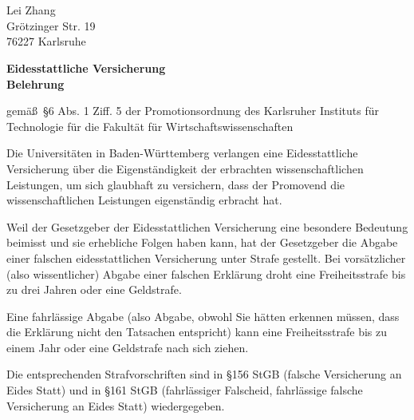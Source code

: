 \cleardoublepage
\section*{}
\thispagestyle{plain}
\vspace{-3cm}
\begin{flushright}
  \noindent
  Lei Zhang\\
  Gr\"otzinger Str. 19\\
  76227 Karlsruhe\\
\end{flushright}

\vspace{0.5cm}

\begin{center}
\textbf{\Large{Eidesstattliche Versicherung}}\\
\vspace{0.5cm}
\textbf{\Large{Belehrung}}
\vspace{0.5cm}

\noindent
gem\"a\ss ~\S 6 Abs. 1 Ziff. 5 der Promotionsordnung des Karlsruher
Instituts f\"ur Technologie f\"ur die Fakult\"at f\"ur
Wirtschaftswissenschaften

\end{center}


\noindent
Die Universit\"aten in Baden-W\"urttemberg verlangen eine Eidesstattliche
Versicherung \"uber die Eigenst\"andigkeit der erbrachten
wissenschaftlichen Leistungen, um sich glaubhaft zu versichern, dass
der Promovend die wissenschaftlichen Leistungen eigenst\"andig erbracht
hat.

\vspace{0.2cm}
\noindent
Weil der Gesetzgeber der Eidesstattlichen Versicherung eine besondere
Bedeutung bei\-misst und sie erhebliche Folgen haben kann, hat der
Gesetzgeber die Abgabe einer falschen eidesstattlichen Versicherung
unter Strafe gestellt. Bei vors\"atzlicher (also wissentlicher) Abgabe
einer falschen Erkl\"arung droht eine Freiheitsstrafe bis zu drei Jahren
oder eine Geldstrafe.

\vspace{0.2cm}
\noindent
Eine fahrl\"assige Abgabe (also Abgabe, obwohl Sie h\"atten erkennen
m\"ussen, dass die Erkl\"arung nicht den Tatsachen entspricht) kann eine
Freiheitsstrafe bis zu einem Jahr oder eine Geldstrafe nach sich
ziehen.

\vspace{0.2cm}
\noindent
Die entsprechenden Strafvorschriften sind in \S 156 StGB (falsche
Versicherung an Eides Statt) und in \S 161 StGB (fahrl\"assiger
Falscheid, fahrl\"assige falsche Versicherung an Eides Statt)
wiedergegeben.

